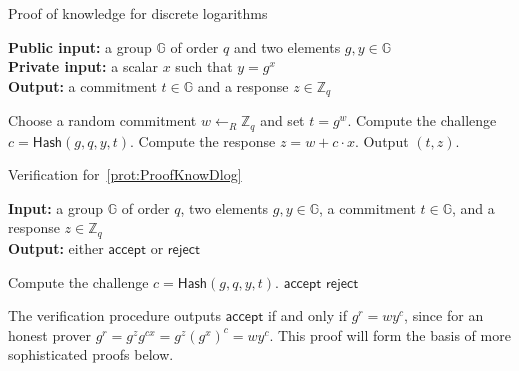 \documentclass[12pt,a4paper]{article}
\theoremstyle{definition}
\begin{document}
\begin{algorithm}\caption{Proof of knowledge for discrete logarithms}\label{prot:ProofKnowDlog}
    \textbf{Public input:} a group $\mathbb{G}$ of order $q$ and two elements $g, y\in\mathbb{G}$\\
    \textbf{Private input:} a scalar $x$ such that $y = g^x$\\
    \textbf{Output:} a commitment $t\in\mathbb{G}$ and a response $z\in\mathbb{Z}_q$
    \begin{algorithmic}[1]
        \State Choose a random commitment $w\leftarrow_R\mathbb{Z}_q$ and set $t = g^w$.
        \State Compute the challenge $c=\mathsf{Hash}(g, q, y, t)$. 
        \State Compute the response $z=w+c\cdot x$.
        \State Output $(t, z)$.
    \end{algorithmic}
\end{algorithm}
\begin{algorithm}\caption{Verification for~\ref{prot:ProofKnowDlog}}
    \textbf{Input:} a group $\mathbb{G}$ of order $q$, two elements $g, y\in\mathbb{G}$, a commitment $t\in\mathbb{G}$, and a response $z\in\mathbb{Z}_q$\\
    \textbf{Output:} either $\mathsf{accept}$ or $\mathsf{reject}$
    \begin{algorithmic}[1]
        \State Compute the challenge $c=\mathsf{Hash}(g, q, y, t)$.
            \State \Return $\mathsf{accept}$
        \Else
            \State \Return $\mathsf{reject}$
        \EndIf
    \end{algorithmic}
\end{algorithm}
The verification procedure outputs $\mathsf{accept}$ if and only if $g^r=wy^c$, since for an honest prover $g^r=g^zg^{cx}=g^z(g^x)^c=wy^c$. This proof will form the basis of more sophisticated proofs below.
\end{document}
